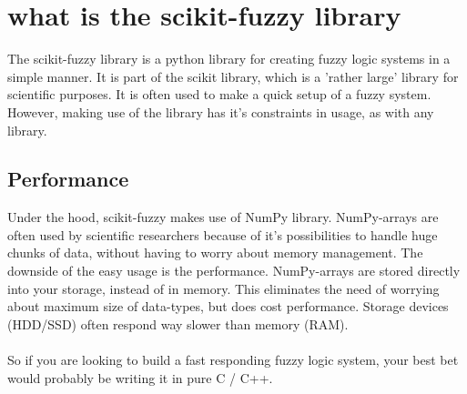 \documentclass[fleqn,10pt]{SelfArx} %
\begin{document}


\section{what is the scikit-fuzzy library}
The scikit-fuzzy library is a python library for creating fuzzy logic systems in a simple manner. It is part of the scikit library, which is a 'rather large' library for scientific purposes. It is often used to make a quick setup of a fuzzy system. However, making use of the library has it's constraints in usage, as with any library.
\subsection{Performance}
Under the hood, scikit-fuzzy makes use of NumPy library. NumPy-arrays are often used by scientific researchers because of it's possibilities to handle huge chunks of data, without having to worry about memory management. The downside of the easy usage is the performance. NumPy-arrays are stored directly into your storage, instead of in memory. This eliminates the need of worrying about maximum size of data-types, but does cost performance. Storage devices (HDD/SSD) often respond way slower than memory (RAM).\\ \\
So if you are looking to build a fast responding fuzzy logic system, your best bet would probably be writing it in pure C / C++.
\end{document}
